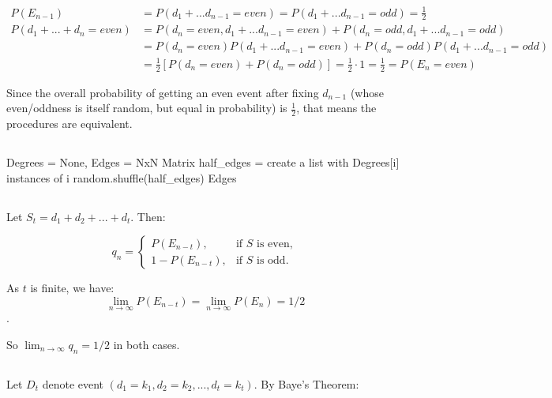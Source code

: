 \documentclass{article}
\begin{document}
$$
\begin{aligned}
P(E_{n-1})&=P(d_1+...d_{n-1}=even)=P(d_1+...d_{n-1}=odd)=\frac{1}{2}\\
P(d_1+...+d_n=even)&=P(d_n=even,d_1+...d_{n-1}=even)+P(d_n=odd,d_1+...d_{n-1}=odd)\\
&=P(d_n=even)P(d_1+...d_{n-1}=even)+P(d_n=odd)P(d_1+...d_{n-1}=odd)\\
&=\frac{1}{2}[P(d_n=even)+P(d_n=odd)]=\frac{1}{2}\cdot 1=\frac{1}{2}=P(E_n=even)
\end{aligned}
$$

Since the overall probability of getting an even event after fixing $d_{n-1}$ (whose even/oddness is itself random, but equal in probability) is $\frac{1}{2}$, that means the procedures are equivalent.

\vspace{-2ex}
\subsection{} 
\vspace{-2ex}
\begin{algorithm}[H]
 Degrees = None, Edges = NxN Matrix\;
half\_edges = create a list with Degrees[i] instances of i\;
random.shuffle(half\_edges)\;
\Return Edges

\end{algorithm}

\subsection{}
\vspace{-2ex}
Let $S_t = d_1 + d_2 + ... + d_t$. Then:

$$q_n  = \begin{cases}
  P(E_{n-t}), & \text{if } S \text{ is even}, \\
  1 - P(E_{n-t}), & \text{if }  S \text{ is odd}.
\end{cases}$$

As $t$ is finite, we have:
$$\lim_{n\to\infty} P(E_{n-t}) = \lim_{n\to\infty} P(E_{n})  = 1/2$$. 

So $\lim_{n\to\infty} q_n = 1/2$ in both cases.

\subsection{}
\vspace{-2ex}
Let $D_t$ denote event $(d_1 = k_1, d_2 = k_2,..., d_t = k_t)$. By Baye's Theorem:
\end{document}
